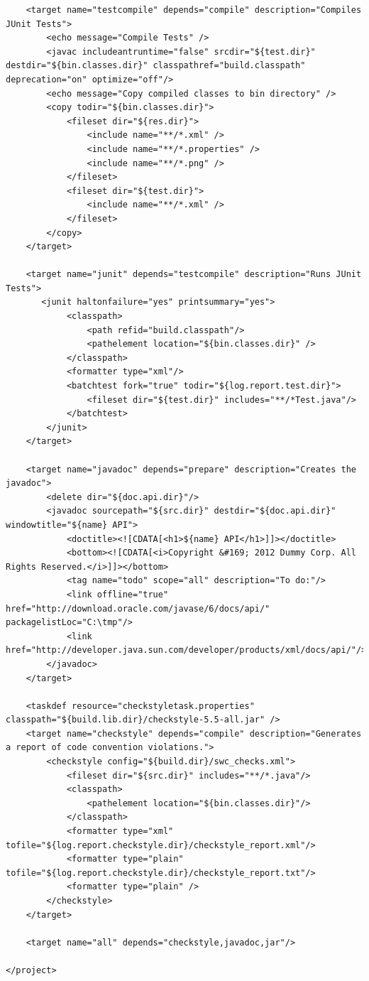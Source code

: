 \documentclass[a4paper,10pt]{article}
\begin{document}
\begin{lstlisting}
	<target name="testcompile" depends="compile" description="Compiles JUnit Tests">
		<echo message="Compile Tests" />
		<javac includeantruntime="false" srcdir="${test.dir}" destdir="${bin.classes.dir}" classpathref="build.classpath" deprecation="on" optimize="off"/>
		<echo message="Copy compiled classes to bin directory" />
		<copy todir="${bin.classes.dir}">
            <fileset dir="${res.dir}">
                <include name="**/*.xml" />
                <include name="**/*.properties" />
                <include name="**/*.png" />
            </fileset>
            <fileset dir="${test.dir}">
                <include name="**/*.xml" />
            </fileset>
        </copy>
	</target>
	
	<target name="junit" depends="testcompile" description="Runs JUnit Tests">
       <junit haltonfailure="yes" printsummary="yes">
        	<classpath>
        		<path refid="build.classpath"/>
        		<pathelement location="${bin.classes.dir}" />
        	</classpath>
        	<formatter type="xml"/>
            <batchtest fork="true" todir="${log.report.test.dir}">
                <fileset dir="${test.dir}" includes="**/*Test.java"/>
            </batchtest>
        </junit>
	</target>
	
	<target name="javadoc" depends="prepare" description="Creates the javadoc">
		<delete dir="${doc.api.dir}"/>
	  	<javadoc sourcepath="${src.dir}" destdir="${doc.api.dir}" windowtitle="${name} API">
	    	<doctitle><![CDATA[<h1>${name} API</h1>]]></doctitle>
	    	<bottom><![CDATA[<i>Copyright &#169; 2012 Dummy Corp. All Rights Reserved.</i>]]></bottom>
		    <tag name="todo" scope="all" description="To do:"/>
		    <link offline="true" href="http://download.oracle.com/javase/6/docs/api/" packagelistLoc="C:\tmp"/>
	    	<link href="http://developer.java.sun.com/developer/products/xml/docs/api/"/>
	  	</javadoc>
	</target>
	
	<taskdef resource="checkstyletask.properties" classpath="${build.lib.dir}/checkstyle-5.5-all.jar" />
	<target name="checkstyle" depends="compile" description="Generates a report of code convention violations.">
		<checkstyle config="${build.dir}/swc_checks.xml">
			<fileset dir="${src.dir}" includes="**/*.java"/>
			<classpath>
				<pathelement location="${bin.classes.dir}"/>
			</classpath>
	  		<formatter type="xml" tofile="${log.report.checkstyle.dir}/checkstyle_report.xml"/>
	  		<formatter type="plain" tofile="${log.report.checkstyle.dir}/checkstyle_report.txt"/>
	  		<formatter type="plain" />
		</checkstyle>
	</target>
	
	<target name="all" depends="checkstyle,javadoc,jar"/>

</project>
\end{lstlisting}
\end{document}
